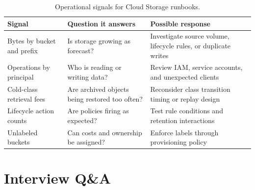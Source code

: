 \begin{table}[H]
\centering
\small
\begin{tabular}{@{}p{3.4cm}p{5.1cm}p{4.2cm}@{}}
\toprule
\textbf{Signal} & \textbf{Question it answers} & \textbf{Possible response} \\
\midrule
Bytes by bucket and prefix & Is storage growing as forecast? & Investigate source volume, lifecycle rules, or duplicate writes \\
Operations by principal & Who is reading or writing data? & Review IAM, service accounts, and unexpected clients \\
Cold-class retrieval fees & Are archived objects being restored too often? & Reconsider class transition timing or replay design \\
Lifecycle action counts & Are policies firing as expected? & Test rule conditions and retention interactions \\
Unlabeled buckets & Can costs and ownership be assigned? & Enforce labels through provisioning policy \\
\bottomrule
\end{tabular}
\caption{Operational signals for Cloud Storage runbooks.}
\label{tab:storage-runbook-signals}
\end{table}

\section{Interview Q\&A}
